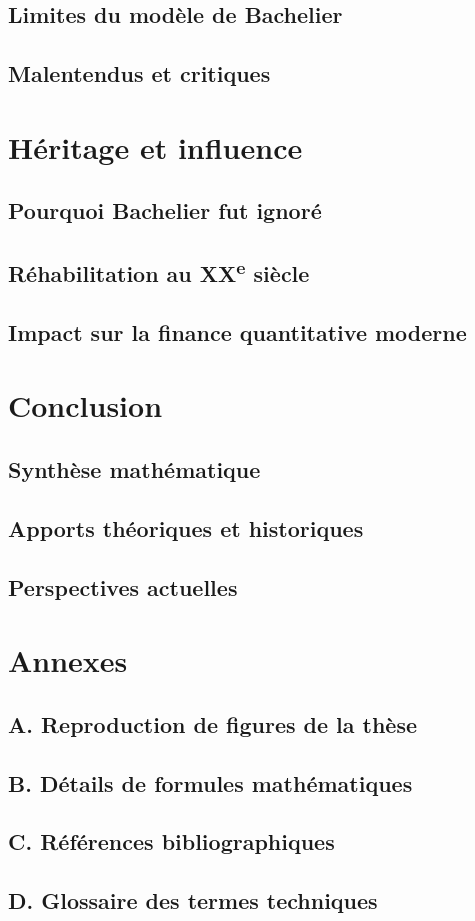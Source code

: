 \documentclass[12pt,a4paper]{article}
\begin{document}
\subsection{Limites du modèle de Bachelier}
\subsection{Malentendus et critiques}

\section{Héritage et influence}
\subsection{Pourquoi Bachelier fut ignoré}
\subsection{Réhabilitation au XX\textsuperscript{e} siècle}
\subsection{Impact sur la finance quantitative moderne}

\section{Conclusion}
\subsection{Synthèse mathématique}
\subsection{Apports théoriques et historiques}
\subsection{Perspectives actuelles}

\appendix
\section*{Annexes}
\subsection*{A. Reproduction de figures de la thèse}
\subsection*{B. Détails de formules mathématiques}
\subsection*{C. Références bibliographiques}
\subsection*{D. Glossaire des termes techniques}
\end{document}
